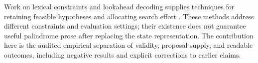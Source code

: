 \documentclass[11pt,letterpaper]{article}
\begin{document}
Work on lexical constraints and lookahead decoding supplies techniques for retaining feasible hypotheses and allocating search effort \citep{hokamp2017grid,post2018fast,lu2022astar}. These methods address different constraints and evaluation settings; their existence does not guarantee useful palindrome prose after replacing the state representation. The contribution here is the audited empirical separation of validity, proposal supply, and readable outcomes, including negative results and explicit corrections to earlier claims.


\renewcommand{\bibsection}{}


\end{document}
